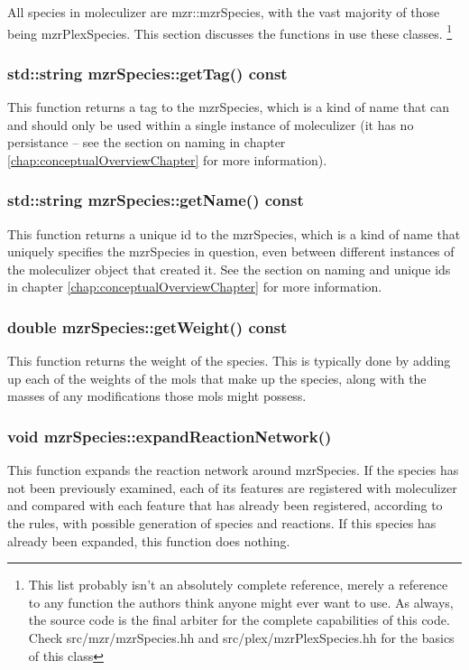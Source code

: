 All species in moleculizer are mzr::mzrSpecies, with the vast majority of
those being mzrPlexSpecies.  This section discusses the functions in
use these classes.  \footnote{This list probably isn't an absolutely
  complete reference, merely a reference to any function the authors
  think anyone might ever want to use.  As always, the source code is
  the final arbiter for the complete capabilities of this code.  Check
  src/mzr/mzrSpecies.hh and src/plex/mzrPlexSpecies.hh for the basics
  of this class}

\subsubsection{std::string mzrSpecies::getTag() const}
This function returns a tag to the mzrSpecies, which is a kind of name
that can and should only be used within a single instance of
moleculizer (it has no persistance -- see the section on naming in
chapter \ref{chap:conceptualOverviewChapter} for more information).

\subsubsection{std::string mzrSpecies::getName() const}
This function returns a unique id to the mzrSpecies, which is a kind
of name that uniquely specifies the mzrSpecies in question, even
between different instances of the moleculizer object that created
it.  See the section on naming and unique ids in chapter
\ref{chap:conceptualOverviewChapter} for more information. 

\subsubsection{double mzrSpecies::getWeight() const}
This function returns the weight of the species.  This is typically
done by adding up each of the weights of the mols that make up the
species, along with the masses of any modifications those mols might
possess.  

\subsubsection{void mzrSpecies::expandReactionNetwork()}
This function expands the reaction network around mzrSpecies.  If the
species has not been previously examined, each of its features are
registered with moleculizer and compared with each feature that has
already been registered, according to the rules, with possible
generation of species and reactions.  If this species has already been
expanded, this function does nothing.

